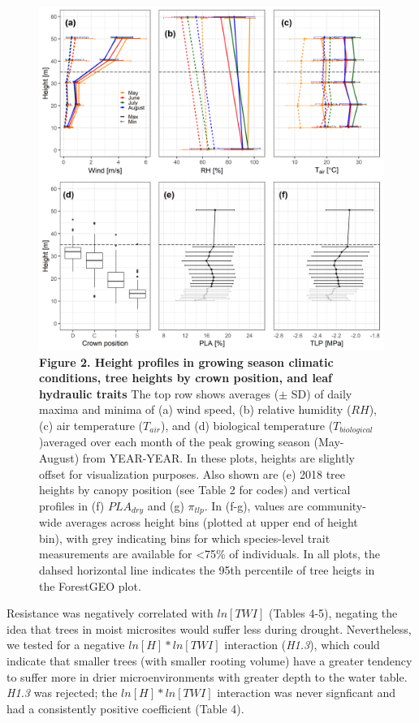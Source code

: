 \documentclass[]{article}
\begin{document}
\begin{figure}
\centering
\includegraphics[width=5.20833in,height=\textheight]{tables_figures/Figure2.png}
\caption{\textbf{Figure 2. Height profiles in growing season climatic
conditions, tree heights by crown position, and leaf hydraulic traits}
The top row shows averages (\(\pm\) SD) of daily maxima and minima of
(a) wind speed, (b) relative humidity (\(RH\)), (c) air temperature
(\(T_{air}\)), and (d) biological temperature
(\(T_{biological}\))averaged over each month of the peak growing season
(May-August) from YEAR-YEAR. In these plots, heights are slightly offset
for visualization purposes. Also shown are (e) 2018 tree heights by
canopy position (see Table 2 for codes) and vertical profiles in (f)
\(PLA_{dry}\) and (g) \(\pi_{tlp}\). In (f-g), values are community-wide
averages across height bins (plotted at upper end of height bin), with
grey indicating bins for which species-level trait measurements are
available for \textless{}75\% of individuals. In all plots, the dahsed
horizontal line indicates the 95th percentile of tree heigts in the
ForestGEO plot.}
\end{figure}

Resistance was negatively correlated with \(ln[TWI]\) (Tables 4-5),
negating the idea that trees in moist microsites would suffer less
during drought. Nevertheless, we tested for a negative
\(ln[H] *ln[TWI]\) interaction (\emph{H1.3}), which could indicate that
smaller trees (with smaller rooting volume) have a greater tendency to
suffer more in drier microenvironments with greater depth to the water
table. \emph{H1.3} was rejected; the \(ln[H] *ln[TWI]\) interaction was
never signficant and had a consistently positive coefficient (Table 4).
\end{document}
